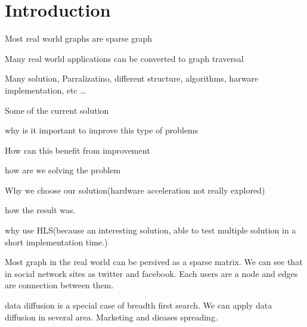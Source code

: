 \chapter{Introduction} \label{intro}

\begin{list_type}  
\item Most real world graphs are sparse graph
\item Many real world applications can be converted to graph traversal
\item Many solution, Parralizatino, different structure, algorithms, harware implementation, etc \ldots 
\item Some of the current solution
\item why is it important to improve this type of problems
\item How can this benefit from improvement
\item how are we solving the problem
\item Why we choose our solution(hardware acceleration not really explored)
\item how the result was.
\item why use HLS(because an interesting solution, able to test multiple solution in a short implementation time.)
\end{list_type}

Most graph in the real world can be persived as a sparse matrix. We can see that in social network sites as twitter and facebook. Each users are a node and edges are connection between them. 

data diffusion is a special case of breadth first search. We can apply data diffusion in several area. Marketing and dieases spreading. 